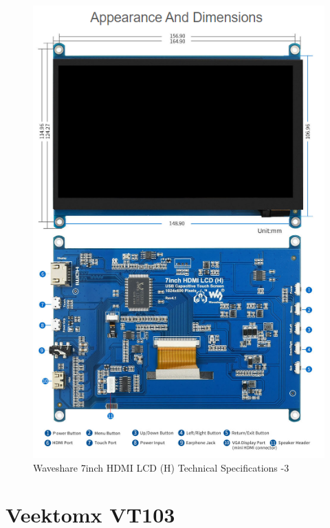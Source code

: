 \begin{figure}[H]
    \centering
    \includegraphics[width=0.85\linewidth]{texs/appendix/data/techspecs/screen3.png}
    \caption{Waveshare 7inch HDMI LCD (H) Technical Specifications -3 }
    \label{fig:lcd-3}
\end{figure}

\section{Veektomx VT103}

